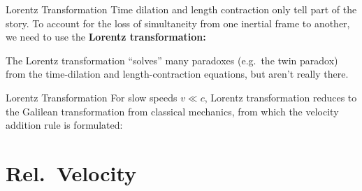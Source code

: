 \documentclass[12pt,compress,aspectratio=169]{beamer}
\begin{document}
\begin{frame}{Lorentz Transformation}
  Time dilation and length contraction only tell part of the story. To account
  for the loss of simultaneity from one inertial frame to another, we need to
  use the \textbf{Lorentz transformation:}

  
  \vspace{-.1in}The Lorentz transformation ``solves'' many paradoxes
  (e.g.\ the twin paradox) from the time-dilation and
  length-contraction equations, but aren't really there.
\end{frame}



\begin{frame}{Lorentz Transformation}
  For slow speeds $v\ll c$, Lorentz transformation reduces to the Galilean
  transformation from classical mechanics, from which the velocity addition
  rule is formulated:

  \vspace{-.45in}{\Large
    \begin{align*}
      x' &= x-vt\\
      y' &= y\\
      z' &= z\\
      t' &= t'
    \end{align*}
  }
\end{frame}



\section{Rel.\ Velocity}
\end{document}
